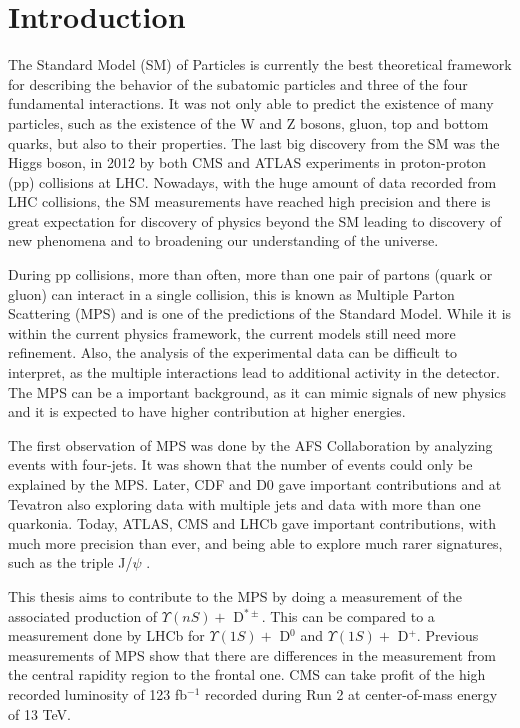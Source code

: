 \chapter*{Introduction}

The Standard Model (SM) of Particles is currently the best theoretical framework for describing the behavior of the subatomic particles and three of the four fundamental interactions. It was not only able to predict the existence of many particles, such as the existence of the W and Z bosons, gluon, top and bottom quarks, but also to their properties. The last big discovery from the SM was the Higgs boson, in 2012 by both CMS and ATLAS experiments in proton-proton (pp) collisions at LHC. Nowadays, with the huge amount of data recorded from LHC collisions, the SM measurements have reached high precision and there is great expectation for discovery of physics beyond the SM leading to discovery of new phenomena and to broadening our understanding of the universe.

During pp collisions, more than often, more than one pair of partons (quark or gluon) can interact in a single collision, this is known as Multiple Parton Scattering (MPS) and is one of the predictions of the Standard Model. While it is within the current physics framework, the current models still need more refinement. Also, the analysis of the experimental data can be difficult to interpret, as the multiple interactions lead to additional activity in the detector. The MPS can be a important background, as it can mimic signals of new physics and it is expected to have higher contribution at higher energies.

The first observation of MPS was done by the AFS Collaboration by analyzing events with four-jets. It was shown that the number of events could only be explained by the MPS. Later, CDF and D0 gave important contributions and at Tevatron also exploring data with multiple jets and data with more than one quarkonia. Today, ATLAS, CMS and LHCb gave important contributions, with much more precision than ever, and being able to explore much rarer signatures, such as the triple J/$\psi$ \cite{CMS:2021qsn}. 

This thesis aims to contribute to the MPS by doing a measurement of the associated production of $\Upsilon(nS) +$ D$^{*\pm}$. This can be compared to a measurement done by LHCb for $\Upsilon(1S) + $ D$^0$ and $\Upsilon(1S) + $ D$^+$. Previous measurements of MPS show that there are differences in the measurement from the central rapidity region to the frontal one. CMS can take profit of the high recorded luminosity of 123 fb$^{-1}$ recorded during Run 2 at center-of-mass energy of 13 TeV.


